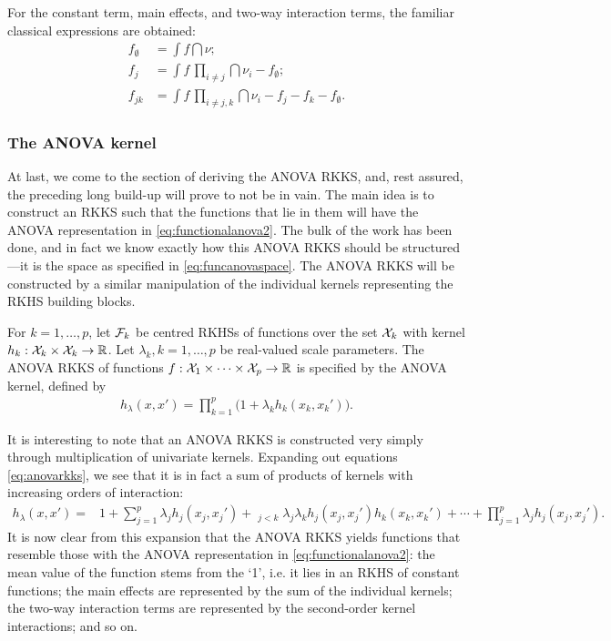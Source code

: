 For the constant term, main effects, and two-way interaction terms, the familiar classical expressions are obtained:
\begin{align*}
  f_\emptyset &= \int f \dint\nu; \\
  f_j &= \int f \, \textstyle\prod_{i\neq j} \dint\nu_i  - f_\emptyset; \\
  f_{jk} &= \int f \, \textstyle\prod_{i\neq j,k} \dint\nu_i  - f_j - f_k - f_\emptyset.
\end{align*}

\subsubsection{The ANOVA kernel}

At last, we come to the section of deriving the ANOVA RKKS, and, rest assured, the preceding long build-up will prove to not be in vain.
The main idea is to construct an RKKS such that the functions that lie in them will have the ANOVA representation in \cref{eq:functionalanova2}.
The bulk of the work has been done, and in fact we know exactly how this ANOVA RKKS should be structured---it is the space as specified in \cref{eq:funcanovaspace}. 
The ANOVA RKKS will be constructed by a similar manipulation of the individual kernels representing the RKHS building blocks.

\begin{definition}\label{def:anovarkks}
  For $k=1,\dots,p$, let ${\mathcal F}_k$ be centred RKHSs of functions over the set ${\mathcal X}_k$ with kernel $h_k:{\mathcal X}_k\times{\mathcal X}_k\to\mathbb{R}$. 
  Let $\lambda_k, k=1,\dots,p$ be real-valued scale parameters.
  The ANOVA RKKS of functions $f:{\mathcal X}_1\times\cdots\times{\mathcal X}_p\to\mathbb{R}$ is specified by the ANOVA kernel, defined by
  \begin{align}\label{eq:anovarkks}
    h_\lambda(x,x') = \prod_{k=1}^p \big( 1 + \lambda_k h_k(x_k,x_k') \big).
  \end{align}
\end{definition}

It is interesting to note that an ANOVA RKKS is constructed very simply through multiplication of univariate kernels.
Expanding out equations \cref{eq:anovarkks}, we see that it is in fact a sum of products of kernels with increasing orders of interaction:
\begin{align*}
  h_\lambda(x,x') 
  ={}& 1 + \sum_{j=1}^p \lambda_j h_j(x_j,x_j') + \mathop{\sum_{j,k=1}^p}_{j<k} \lambda_j\lambda_k h_j(x_j,x_j')h_k(x_k,x_k')
  + \cdots + \prod_{j=1}^p \lambda_j h_j(x_j,x_j').
\end{align*}
It is now clear from this expansion that the ANOVA RKKS yields functions that resemble those with the ANOVA representation in \cref{eq:functionalanova2}:
the mean value of the function stems from the `1', i.e. it lies in an RKHS of constant functions; the main effects are represented by the sum of the individual kernels; the two-way interaction terms are represented by the second-order kernel interactions; and so on.

